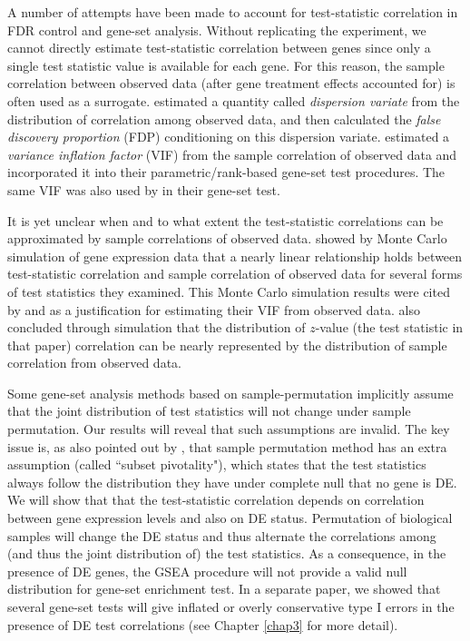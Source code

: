 A number of attempts have been made to account for test-statistic
correlation in FDR control and gene-set analysis. 
Without replicating the experiment, we cannot directly estimate test-statistic
correlation between genes since only a single test statistic value is 
available for each gene. For this reason, the sample correlation
between observed data (after gene 
treatment effects accounted for) is often used as a surrogate.
\citet{efron2007correlation} estimated a quantity called \textit{dispersion variate} from the 
distribution 
of correlation among observed data, and then calculated the \textit{false discovery proportion} 
(FDP) conditioning on this dispersion variate. \citet{wu2012camera} estimated a \textit{variance 
	inflation factor} (VIF) from the sample correlation of observed data and 
incorporated it into their parametric/rank-based gene-set test procedures. The same VIF was also 
used by \citet{yaari2013quantitative} in their gene-set test. 

It is yet unclear when and to what extent the test-statistic correlations can be approximated 
by sample correlations of observed
data. 
\citet{barry2008statistical} showed by Monte Carlo simulation of gene
expression data that a nearly linear relationship holds between test-statistic correlation and 
sample correlation of observed data for
several forms of test statistics they examined. This Monte Carlo
simulation results were cited by \citet{wu2012camera} and
\citet{yaari2013quantitative} as a justification for estimating their
VIF from observed data. \citet{efron2007correlation} also concluded
through simulation that the distribution of $z$-value (the test
statistic in that paper) correlation can be nearly represented by the
distribution of sample correlation from observed data. 	


Some gene-set analysis methods based on sample-permutation implicitly
assume that the joint distribution of test statistics will not change
under sample permutation. Our results will reveal that such assumptions
are invalid.  
The key issue is, as also pointed out by  \citet{efron2012large1}, that sample permutation 
method has an
extra assumption (called ``subset pivotality"), which states that the test statistics always follow 
the distribution they have under complete null that no gene is DE.
We will show that that the test-statistic correlation depends on
correlation between gene expression levels and also on DE status.
Permutation of biological samples will change the DE status and thus
alternate the correlations among  (and thus the joint distribution of) the
test statistics. As a consequence, in the presence of DE genes, the
GSEA \citep{subramanian2005gene} procedure will not provide a valid null distribution for 
gene-set enrichment test. In a separate paper, we showed that several
gene-set tests will give inflated or overly conservative type I errors in the presence of DE test
correlations (see Chapter \ref{chap3} for more detail).

